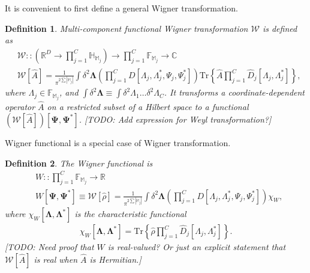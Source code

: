 \documentclass[12pt,aip,jmp,amssymb,amsmath]{revtex4-1}
\newtheorem{definition}{Definition}
\begin{document}
It is convenient to first define a general Wigner transformation.

\begin{definition}
\label{def:func-wigner:w-transformation}
    Multi-component functional Wigner transformation $\mathcal{W}$ is defined as
    \begin{equation*}\begin{split}
    &    \mathcal{W} :: \left( \mathbb{R}^D \rightarrow \prod_{j=1}^C \mathbb{H}_{\mathbb{M}_j} \right)
            \rightarrow \prod_{j=1}^C \mathbb{F}_{\mathbb{M}_j}
            \rightarrow \mathbb{C} \\
    &    \mathcal{W}[\hat{A}]
        = \frac{1}{\pi^{2 \sum|\mathbb{M}_j|}} \int \delta^2 \boldsymbol{\Lambda}
            \left( \prod_{j=1}^C D[\Lambda_j, \Lambda_j^*, \Psi_j, \Psi_j^*] \right)
            \mathrm{Tr} \left\{ \hat{A} \prod_{j=1}^C \hat{D}_j[\Lambda_j, \Lambda_j^*] \right\},
    \end{split}\end{equation*}
    where $\Lambda_j \in \mathbb{F}_{\mathbb{M}_j}$, and $\int \delta^2 \boldsymbol{\Lambda} \equiv \int \delta^2 \Lambda_1 \ldots \delta^2 \Lambda_C$.
    It transforms a coordinate-dependent operator $\hat{A}$ on a restricted subset of a Hilbert space to a functional $(\mathcal{W}[\hat{A}])[\boldsymbol{\Psi}, \boldsymbol{\Psi}^*]$.
    [TODO: Add expression for Weyl transformation?]
\end{definition}

Wigner functional is a special case of Wigner transformation.

\begin{definition}
\label{def:func-wigner:w-functional}
    The Wigner functional is
    \begin{equation*}\begin{split}
    &    W :: \prod_{j=1}^C \mathbb{F}_{\mathbb{M}_j} \rightarrow \mathbb{R} \\
    &    W [\boldsymbol{\Psi}, \boldsymbol{\Psi}^*]
        \equiv \mathcal{W}[\hat{\rho}]
        = \frac{1}{\pi^{2 \sum|\mathbb{M}_j|}} \int \delta^2 \boldsymbol{\Lambda}
            \left( \prod_{j=1}^C D[\Lambda_j, \Lambda_j^*, \Psi_j, \Psi_j^*] \right) \chi_W,
    \end{split}\end{equation*}
    where $\chi_W [\boldsymbol{\Lambda}, \boldsymbol{\Lambda}^*]$ is the characteristic functional
    \begin{equation*}\begin{split}
        \chi_W [\boldsymbol{\Lambda}, \boldsymbol{\Lambda}^*]
        = \mathrm{Tr} \left\{ \hat{\rho} \prod_{j=1}^C \hat{D}_j[\Lambda_j, \Lambda_j^*] \right\}.
    \end{split}\end{equation*}
    [TODO: Need proof that $W$ is real-valued?
    Or just an explicit statement that $\mathcal{W}[\hat{A}]$ is real when $\hat{A}$ is Hermitian.]
\end{definition}
\end{document}
